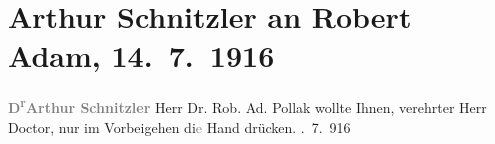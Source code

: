 

         
         \renewcommand{\erwaehntePersonen}{Personen: Robert Adam}
         \renewcommand{\erwaehnteOrte}{Orte: Altaussee}
         \renewcommand{\erwaehnteWerke}{}
               \section[Arthur Schnitzler an Robert Adam, 14. 7. 1916]{ Arthur Schnitzler an Robert Adam, 14. 7. 1916}\nopagebreak{}\rehead{ }\begin{ledgroupsized}[t]{13cm}\normalsize\beginnumbering{} \toendnotes[C]{\smallbreak\pagebreak[2]} 
\pstart
           \noindent{}\centering{}{\pb}\textcolor{gray}{\textbf{D\textsuperscript{r}Arthur Schnitzler}}\pend
           \pstart
           \noindent{}Herr Dr. Rob. Ad. Pollak\pend
           \pstart
           {\pb}wollte Ihnen, verehrter Herr Doctor, nur im Vorbeigehen
                  di\textcolor{gray}{e} Hand drücken.\pend
           . 7. 916\pend
           
         
         \endnumbering{}\end{ledgroupsized}  \newcommand{\dateiname}{L02231}\newcommand{\titel}{Arthur Schnitzler an Robert Adam, 14. 7. 1916}\newcommand{\editorInnen}{Martin Anton Müller und Gerd-Hermann Susen}
      
